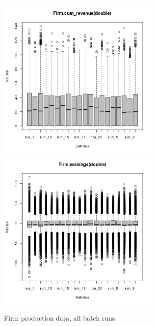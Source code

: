 \begin{figure}[H!]
\centering\leavevmode
\begin{minipage}{17cm}
\centering\leavevmode
\includegraphics[width=8cm]{./png/tax_0.10/Firm-cum_revenue-batches.png}
\includegraphics[width=8cm]{./png/tax_0.10/Firm-earnings-batches.png}
\end{minipage}
\caption{Firm production data, all batch runs.}
\label{Figure: Firm Production batch}
\end{figure}
\clearpage


